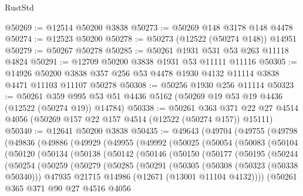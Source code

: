 \begin{lexlean}{RustStd}
\begin{coremodule}
@50269 := @12514 @50200 @3838
@50273 := @50269 @148 @3178 @148 @4478
@50274 := @12523 @50200
@50278 := @50273 (@12522 (@50274 @148)) @14951
@50279 := @50267 @50278
@50285 := @50261 @1931 @531 @53 @263 @11118 @4824
@50291 := @12709 @50200 @3838 @1931 @53 @11111 @11116
@50305 := @14926
    @50200
    @3838
    @357
    @256
    @53
    @4478
    @1930
    @4132
    @11114
    @3838
    @4471
    @11103
    @11107
    @50278
@50308 := @50256 @1930 @256 @11114
@50323 := @50261
    @359
    @995
    @53
    @51
    @4436
    @5162
    (@50269 @19 @53 @19 @4436 (@12522 (@50274 @19)) @14784)
@50338 := @50261
    @363
    @371
    @22
    @27
    @4514
    @4056
    (@50269 @157 @22 @157 @4514 (@12522 (@50274 @157)) @15111)
@50340 := @12641 @50200 @3838
@50435 := @49643
    (@49704
      (@49755
        (@49798
          (@49836
            (@49886
              (@49929
                (@49955
                  (@49992
                    (@50025
                      (@50054
                        (@50083
                          (@50104
                            (@50120
                              (@50134
                                (@50138
                                  (@50142
                                    (@50146
                                      (@50150
                                        (@50177
                                          (@50195
                                            (@50244
                                              (@50254
                                                (@50259
                                                  (@50279
                                                    (@50285
                                                      (@50291
                                                        (@50305
                                                          (@50308 (@50323 (@50338 @50340)))
                                                          @47935
                                                          @21715
                                                          @14986
                                                          (@12671 (@13001 @11104 @4132))))
                                                      (@50261
                                                        @365
                                                        @371
                                                        @90
                                                        @27
                                                        @4516
                                                        @4056

\end{coremodule}
\end{lexlean}

